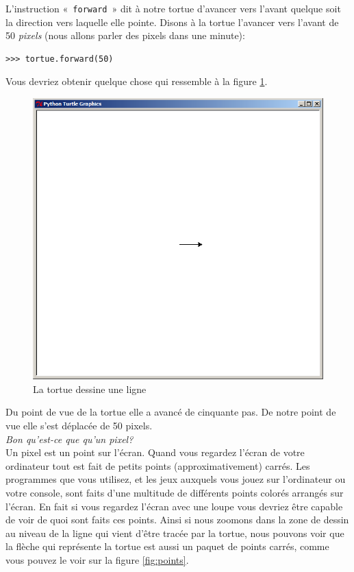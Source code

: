 L'instruction «~\texttt{forward}~» dit à notre tortue d'avancer vers l'avant quelque soit la direction vers laquelle elle pointe. Disons à la tortue l'avancer vers l'avant de 50 \emph{pixels} (nous allons parler des pixels dans une minute):

\begin{Verbatim}[frame=single,rulecolor=\color{mbleu}, label=à taper]
>>> tortue.forward(50)
\end{Verbatim}

Vous devriez obtenir quelque chose qui ressemble à la figure \ref{fig:50px}.

\begin{figure}[h!]
\centering
\includegraphics[scale=0.4]{images/50px.png}
\caption{La tortue dessine une ligne}
\label{fig:50px}
\end{figure}

Du point de vue de la tortue elle a avancé de cinquante pas. De notre point de vue elle s'est déplacée  de 50 pixels.\\


\emph{Bon qu'est-ce que qu'un pixel?}\\

Un pixel est un point sur l'écran. Quand vous regardez l'écran de votre ordinateur tout est fait de petits points (approximativement) carrés. Les programmes que vous utilisez, et les jeux auxquels vous jouez sur l'ordinateur ou votre console, sont faits d'une multitude de différents points colorés arrangés sur l'écran. En fait si vous regardez l'écran avec une loupe vous devriez être capable de voir de quoi sont faits ces points. Ainsi si nous zoomons dans la zone de dessin au niveau de la ligne qui vient d'être tracée par la tortue, nous pouvons voir que la flèche qui représente la tortue est aussi un paquet de points carrés, comme vous pouvez le voir sur la figure \ref{fig:points}.

